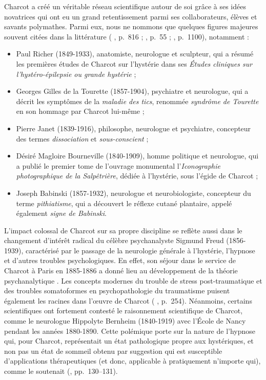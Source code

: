 Charcot a créé un véritable réseau scientifique autour de soi grâce à ses idées novatrices qui ont eu un grand retentissement parmi ses collaborateurs, élèves et savants polymathes. Parmi eux, nous ne nommons que quelques figures majeures souvent citées dans la littérature (\citeauthor{gomes2013jean} \citeyear{gomes2013jean}, p.~816 ; \citeauthor{bogousslavsky2014mysteries} \citeyear{bogousslavsky2014mysteries}, p.~55 ; \citeauthor{camargo2024} \citeyear{camargo2024}, p.~1100), notamment :
\begin{itemize}
\item Paul Richer (1849-1933), anatomiste, neurologue et sculpteur, qui a résumé les premières études de Charcot sur l'hystérie dans ses \textit{Études cliniques sur l'hystéro-épilepsie ou grande hystérie} ;
\item Georges Gilles de la Tourette (1857-1904), psychiatre et neurologue, qui a décrit les symptômes de la \textit{maladie des tics}, renommée \textit{syndrôme de Tourette} en son hommage par Charcot lui-même ;
\item Pierre Janet (1839-1916), philosophe, neurologue et psychiatre, concepteur des termes \textit{dissociation} et \textit{sous-conscient} ;
\item Désiré Magloire Bourneville (1840-1909), homme politique et neurologue, qui a publié le premier tome de l'ouvrage monumental l'\textit{Iconographie photographique de la Salpêtrière}, dédiée à l'hystérie, sous l'égide de Charcot ; 
\item Joseph Babinski (1857-1932), neurologue et neurobiologiste, concepteur du terme \textit{pithiatisme}, qui a découvert le réflexe cutané plantaire, appelé également \textit{signe de Babinski}.
\end{itemize}
\bigskip
L'impact colossal de Charcot sur sa propre discipline se reflète aussi dans le changement d'intérêt radical du célèbre psychanalyste Sigmund Freud (1856-1939), caractérisé par le passage de la neurologie générale à l'hystérie, l'hypnose et d'autres troubles psychologiques. En effet, son séjour dans le service de Charcot à Paris en 1885-1886 a donné lieu au développement de la théorie psychanalytique \citep[p.~41]{camargo2018jean}. Les concepts modernes du trouble de stress post-traumatique et des troubles somatoformes en psychopathologie du traumatisme puisent également les racines dans l'\oe{}uvre de Charcot (\citeauthor{white1997jean} \citeyear{white1997jean}, p.~254). Néanmoins, certains scientifiques ont fortement contesté le raisonnement scientifique de Charcot, comme le neurologue Hippolyte Bernheim (1840-1919) avec l'École de Nancy pendant les années 1880-1890. Cette polémique porte sur la nature de l'hypnose qui, pour Charcot, représentait un état pathologique propre aux hystériques, et non pas un état de sommeil obtenu par suggestion qui est susceptible d'applications
thérapeutiques (et donc, applicable à pratiquement n'importe qui), comme le soutenait \citeauthor{bernheim1891suggestion} (\citeyear{bernheim1891suggestion}, pp.~130--131).

